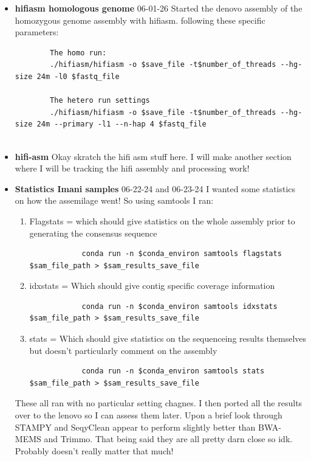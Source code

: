 \documentclass{article}
\begin{document}
\begin{itemize}
        \item \textbf{hifiasm homologous genome} {06-01-26} Started the denovo assembly of the homozygous genome assembly with hifiasm.   following these specific parameters:
        	\begin{verbatim}
		The homo run:
		./hifiasm/hifiasm -o $save_file -t$number_of_threads --hg-size 24m -l0 $fastq_file
		
		The hetero run settings
		./hifiasm/hifiasm -o $save_file -t$number_of_threads --hg-size 24m --primary -l1 --n-hap 4 $fastq_file
		
	\end{verbatim}
	
	\item \textbf{hifi-asm}  Okay skratch the hifi asm stuff here.  I will make another section where I will be tracking the hifi assembly and processing work!
	
    \item \textbf{Statistics Imani samples} 06-22-24 and 06-23-24  I wanted some statistics on how the assemilage went! 
    So using samtools I ran:
    \begin{enumerate}
        \item Flagstats = which should give statistics on the whole assembly prior to generating the consensus sequence
        \begin{verbatim}
            conda run -n $conda_environ samtools flagstats $sam_file_path > $sam_results_save_file
        \end{verbatim}
        \item idxstats = Which should give contig specific coverage information
        \begin{verbatim}
            conda run -n $conda_environ samtools idxstats $sam_file_path > $sam_results_save_file
        \end{verbatim}
        \item stats = Which should give statistics on the sequenceing results themselves but doesn't particularly comment on the assembly
        \begin{verbatim}
            conda run -n $conda_environ samtools stats $sam_file_path > $sam_results_save_file
        \end{verbatim}
    \end{enumerate}
    These all ran with no particular setting chagnes.   I then ported all the results over to the lenovo so I can assess them later.   Upon a brief look through STAMPY and SeqyClean appear to perform slightly better than BWA-MEMS and Trimmo.   That being said they are all pretty darn close so idk.  Probably doesn't really matter that much!



\end{itemize}
\end{document}
